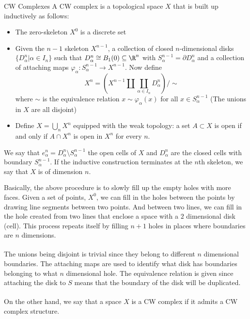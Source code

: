 \documentclass[a4paper]{article}
\begin{document}
\begin{defn}{CW Complexes}{} A CW complex is a topological space $X$ that is built up inductively as follows: 
\begin{itemize}
\item The zero-skeleton $X^0$ is a discrete set
\item Given the $n-1$ skeleton $X^{n-1}$, a collection of closed $n$-dimensional disks $\{D_{\alpha}^n|\alpha\in I_n\}$ such that $D_\alpha^n\cong B_1(0)\subseteq\R^n$ with $S_\alpha^{n-1}=\partial D_\alpha^n$ and a collection of attaching maps $\varphi_\alpha:S_\alpha^{n-1}\to X^{n-1}$. Now define $$X^n=\left(X^{n-1}\amalg\coprod_{\alpha\in I_n}D_\alpha^n\right)/\sim$$ where $\sim$ is the equivalence relation $x\sim\varphi_\alpha(x)$ for all $x\in S_\alpha^{n-1}$ (The unions in $X$ are all disjoint)
\item Define $X=\bigcup_nX^n$ equipped with the weak topology: a set $A\subset X$ is open if and only if $A\cap X^n$ is open in $X^n$ for every $n$. 
\end{itemize}
We say that $e_\alpha^n=D_\alpha^n\setminus S_\alpha^{n-1}$ the open cells of $X$ and $D_\alpha^n$ are the closed cells with boundary $S_\alpha^{n-1}$. If the inductive construction terminates at the $n$th skeleton, we say that $X$ is of dimension $n$. 
\end{defn}

Basically, the above procedure is to slowly fill up the empty holes with more faces. Given a set of points, $X^0$, we can fill in the holes between the points by drawing line segments between two points. And between two lines, we can fill in the hole created from two lines that enclose a space with a $2$ dimensional disk (cell). This process repeats itself by filling $n+1$ holes in places where boundaries are $n$ dimensions. \\~\\
The unions being disjoint is trivial since they belong to different $n$ dimensional boundaries. The attaching maps are used to identify what disk has boundaries belonging to what $n$ dimensional hole. The equivalence relation is given since attaching the disk to $S$ means that the boundary of the disk will be duplicated. \\~\\

On the other hand, we say that a space $X$ is a CW complex if it admits a CW complex structure. 
\end{document}
